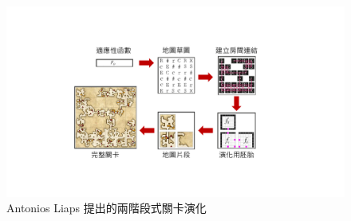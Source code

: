 \begin{figure}[!htb]
  \begin{center}
    \includegraphics[width=1.0\textwidth]{figures/Multi-segment演化框架.pdf}
    \caption{Antonios Liaps 提出的兩階段式關卡演化} 
    \label{fig:multi-segment-evolution}
  \end{center}
\end{figure}







